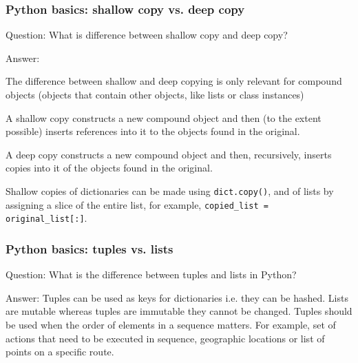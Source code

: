 \documentclass[11pt]{beamer}
\begin{document}
\begin{frame}
\frametitle{Python basics: shallow copy vs. deep copy}
\begin{block}{Question:}
	What is difference between shallow copy and deep copy?
\end{block}
\begin{block}{Answer:}
	
	The difference between shallow and deep copying is only relevant for compound objects (objects that contain other objects, like lists or class instances)
	
	A shallow copy constructs a new compound object and then (to the extent possible) inserts references into it to the objects found in the original.
	
	A deep copy constructs a new compound object and then, recursively, inserts copies into it of the objects found in the original.
	
	Shallow copies of dictionaries can be made using \texttt{dict.copy()}, and of lists by assigning a slice of the entire list, for example, \texttt{copied\_list = original\_list[:]}.
\end{block}
\end{frame}


\begin{frame}
\frametitle{Python basics: tuples vs. lists}
\begin{block}{Question:}
	What is the difference between tuples and lists in Python?
\end{block}
\begin{block}{Answer:}
	Tuples can be used as keys for dictionaries i.e. they can be hashed. Lists are mutable whereas tuples are immutable  they cannot be changed. Tuples should be used when the order of elements in a sequence matters. For example, set of actions that need to be executed in sequence, geographic locations or list of points on a specific route.
\end{block}
\end{frame}
\end{document}

